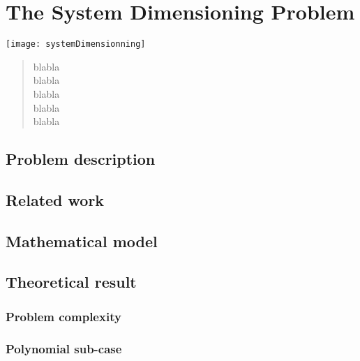 \chapter{The System Dimensioning Problem} \label{chap:sdp}
\begin{bibunit}[ieeetr]
\minitoc
\vspace{2cm}

\begin{minipage}[c]{0.45\linewidth}
\texttt{[image: systemDimensionning]}
\end{minipage}
\hfill
\begin{minipage}[c]{0.45\linewidth}
\begin{abstract}
blabla\\
blabla\\
blabla\\
blabla\\
blabla\\
\end{abstract}
\end{minipage}

\newpage
\section{Problem description}


\newpage
\section{Related work}


\newpage
\section{Mathematical model}


\newpage
\section{Theoretical result}
\subsection{Problem complexity}
\subsection{Polynomial sub-case}

\newpage
{}
\renewcommand{\bibname}{Bibliography of chapter \thechapter}
\end{bibunit}
